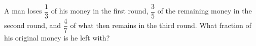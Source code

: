 A man loses $\dfrac13$ of his money in the first round, $\dfrac35$ of the remaining money in the second round, and $\dfrac47$ of what then remains in the third round. What fraction of his original money is he left with?
